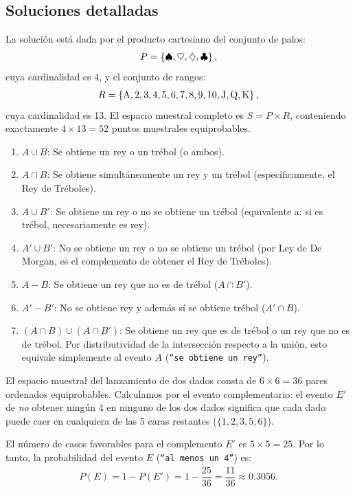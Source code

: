 \subsection*{Soluciones detalladas}

\begin{solproblema}[prob:de3947a]
	La solución está dada por el producto cartesiano del conjunto de palos:
	\begin{align}
		P = \left\{ \spadesuit, \heartsuit, \diamondsuit, \clubsuit \right\},
	\end{align}
	cuya cardinalidad es 4, y el conjunto de rangos:
	\begin{align}
		R = \left\{ \text{A}, 2, 3, 4, 5, 6, 7, 8, 9, 10, \text{J}, \text{Q}, \text{K} \right\},
	\end{align}
	cuya cardinalidad es 13. El espacio muestral completo es $S = P \times R$, conteniendo exactamente $4 \times 13 = 52$ puntos muestrales equiprobables.
\end{solproblema}

\begin{solproblema}
	\begin{enumerate}
		\item $A \cup B$: Se obtiene un rey o un trébol (o ambos).
		\item $A \cap B$: Se obtiene simultáneamente un rey y un trébol (específicamente, el Rey de Tréboles).
		\item $A \cup B'$: Se obtiene un rey o no se obtiene un trébol (equivalente a: si es trébol, necesariamente es rey).
		\item $A' \cup B'$: No se obtiene un rey o no se obtiene un trébol (por Ley de De Morgan, es el complemento de obtener el Rey de Tréboles).
		\item $A - B$: Se obtiene un rey que no es de trébol ($A \cap B'$).
		\item $A' - B'$: No se obtiene rey y además sí se obtiene trébol ($A' \cap B$).
		\item $(A \cap B) \cup (A \cap B')$: Se obtiene un rey que es de trébol o un rey que no es de trébol. Por distributividad de la intersección respecto a la unión, esto equivale simplemente al evento $A$ (\texttt{``se obtiene un rey''}).
	\end{enumerate}
\end{solproblema}

\begin{solproblema}[prob:69a20ec]
	El espacio muestral del lanzamiento de dos dados consta de $6 \times 6 = 36$ pares ordenados equiprobables. Calculamos por el evento complementario: el evento $E'$ de \emph{no} obtener ningún 4 en ninguno de los dos dados significa que cada dado puede caer en cualquiera de las 5 caras restantes ($\{1,2,3,5,6\}$).

	El número de casos favorables para el complemento $E'$ es $5 \times 5 = 25$. Por lo tanto, la probabilidad del evento $E$ (\texttt{``al menos un 4''}) es:
	\begin{align}
		P(E) = 1 - P(E') = 1 - \dfrac{25}{36} = \dfrac{11}{36} \approx 0.3056.
	\end{align}
\end{solproblema}

